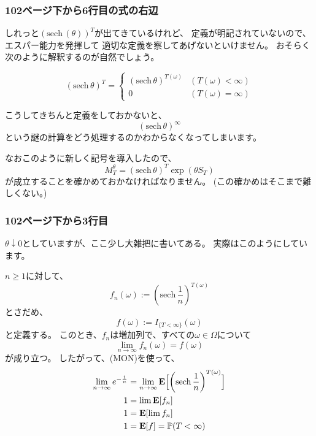       \subsubsection{102ページ下から6行目の式の右辺}
        しれっと$(\text{sech}\,(\theta))^T$が出てきているけれど、
        定義が明記されていないので、エスパー能力を発揮して
        適切な定義を察してあげないといけません。
        おそらく次のように解釈するのが自然でしょう。
        \begin{def*}
          \begin{equation*}
            (\text{sech}\, \theta)^T =
            \begin{cases}
              (\text{sech}\, \theta)^{T(\omega)} & (T(\omega) < \infty)\\
              0 & (T(\omega) = \infty)
            \end{cases}
          \end{equation*}
        \end{def*}
        こうしてきちんと定義をしておかないと、
        \[
          (\text{sech}\, \theta)^{\infty}
        \]
        という謎の計算をどう処理するのかわからなくなってしまいます。

        なおこのように新しく記号を導入したので、
        \[
          M^{\theta}_T = (\text{sech}\, \theta)^T \exp{(\theta S_{T})}
        \]
        が成立することを確かめておかなければなりません。
        (この確かめはそこまで難しくない。)

      \subsubsection{102ページ下から3行目}
        $\theta \downarrow 0$としていますが、ここ少し大雑把に書いてある。
        実際はこのようにしています。

        $n \ge 1$に対して、
        \[
          f_n(\omega ) :=
          \left(\text{sech}\, \frac{1}{n}\right)^{T(\omega)}
        \]
        とさだめ、
        \[
          f(\omega ) := I_{\{T < \infty \}}(\omega)
        \]
        と定義する。
        このとき、$f_n$は増加列で、すべての$\omega \in \Omega$について
        \[
          \lim_{n \to \infty}f_n(\omega) = f(\omega)
        \]
        が成り立つ。
        したがって、(MON)を使って、
        \begin{align*}
          \lim_{n \to \infty}e^{-\frac{1}{n}} &=
          \lim_{n \to \infty}{\mathbf{E}} \Bigl[\left(\text{sech}\, \frac{1}{n}\right)^{T(\omega)} \Bigr] \\
          1 &= \lim {\mathbf{E}}[f_n] \\
          1 &= {\mathbf{E}}[\lim f_n] \\
          1 &= {\mathbf{E}}[f] = {\mathbb{P}}(T < \infty)
        \end{align*}

